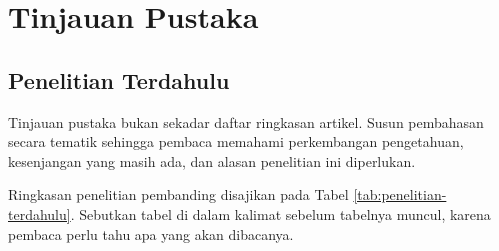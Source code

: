 \chapter{Tinjauan Pustaka}



\section{Penelitian Terdahulu}

Tinjauan pustaka bukan sekadar daftar ringkasan artikel. Susun pembahasan secara tematik sehingga pembaca memahami perkembangan pengetahuan, kesenjangan yang masih ada, dan alasan penelitian ini diperlukan.

Ringkasan penelitian pembanding disajikan pada Tabel \ref{tab:penelitian-terdahulu}. Sebutkan tabel di dalam kalimat sebelum tabelnya muncul, karena pembaca perlu tahu apa yang akan dibacanya.

